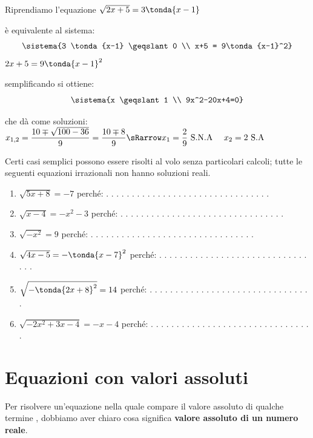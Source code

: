 \begin{esempio}
Riprendiamo l'equazione \(\sqrt{2x+5} = 3 \tonda{x-1}\)
 
 è equivalente al sistema: 
\[\sistema{3 \tonda{x-1} \geqslant 0 \\
           x+5 = 9\tonda{x-1}^2}
\]
\(2x+5 = 9\tonda{x-1}^2\)
 
 semplificando si ottiene: 
\[\sistema{x \geqslant 1 \\
           9x^2-20x+4=0}
\]

 che dà come soluzioni:
 \(x_{1,2} = \dfrac{10 \mp \sqrt{100-36}}{9} = \dfrac{10 \mp 8}{9} \sRarrow 
 x_1 = \dfrac{2}{9} \text{ S.N.A } \quad  x_2 = 2 \text{ S.A}\)
 
\end{esempio}

Certi casi semplici possono essere risolti al volo senza particolari calcoli;
tutte le seguenti equazioni irrazionali non hanno soluzioni reali.

\begin{enumerate}
 \item \(\sqrt{5x +8} = -7\) 
 \hfill perché: . . . . . . . . . . . . . . . . . . . . . . . . . . . . . . . .
 \item \(\sqrt{x-4} = -x^2-3\) 
 \hfill perché: . . . . . . . . . . . . . . . . . . . . . . . . . . . . . . . .
 \item \(\sqrt{-x^2} = 9\)  
 \hfill perché: . . . . . . . . . . . . . . . . . . . . . . . . . . . . . . . .
 \item \(\sqrt{4x-5} = -\tonda{x-7}^2\) 
 \hfill perché: . . . . . . . . . . . . . . . . . . . . . . . . . . . . . . . .
 \item \(\sqrt{-\tonda{2x+8}^2} = 14\) 
 \hfill perché: . . . . . . . . . . . . . . . . . . . . . . . . . . . . . . . .
 \item \(\sqrt{-2x^2 + 3x -4} = -x-4\) 
 \hfill perché: . . . . . . . . . . . . . . . . . . . . . . . . . . . . . . . .
\end{enumerate}

\section{Equazioni con valori assoluti}
Per risolvere un'equazione nella quale compare il valore assoluto di qualche 
termine , dobbiamo aver chiaro cosa significa \textbf{valore assoluto di un 
numero reale}.
